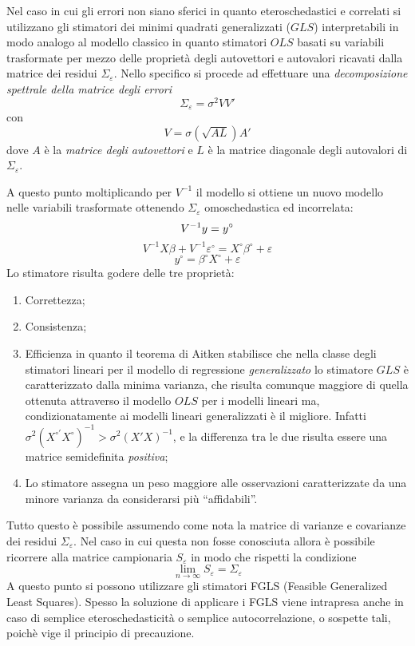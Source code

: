 \documentclass[a4page, 11pt]{article} %
\begin{document}
Nel caso in cui gli errori non siano sferici in quanto eteroschedastici e correlati si utilizzano gli stimatori dei minimi quadrati generalizzati ($GLS$) interpretabili in modo analogo al modello classico in quanto stimatori $OLS$ basati su variabili trasformate per mezzo delle proprietà degli autovettori e autovalori ricavati dalla matrice dei residui $\Sigma_\varepsilon$.
Nello specifico si procede ad effettuare una \textit{decomposizione spettrale della matrice degli errori} 
\[
\Sigma_\varepsilon = \sigma^2 VV'
\]
con
\[
V = \sigma (\sqrt{AL})A'
\]
dove $A$ è la \textit{matrice degli autovettori} e $L$ è la matrice diagonale degli autovalori di $\Sigma_\varepsilon$.

A questo punto moltiplicando per $V^{-1}$ il modello si ottiene un nuovo modello nelle variabili trasformate ottenendo $\Sigma_\varepsilon$ omoschedastica ed incorrelata:
\begin{equation*}
V^{-1}y = y^\circ \\
\end{equation*}
\begin{equation*}
V^{-1}X\beta + V^{-1}\varepsilon^\circ = X^\circ\beta^\circ + \varepsilon
\end{equation*}
\begin{equation*}
y^\circ = \beta^\circ X^\circ + \varepsilon
\end{equation*}
Lo stimatore risulta godere delle tre proprietà:
\begin{enumerate}[noitemsep]
\item Correttezza;
\item Consistenza;
\item Efficienza in quanto il teorema di Aitken stabilisce che nella classe degli stimatori lineari per il modello di regressione \textit{generalizzato} lo stimatore $GLS$ è caratterizzato dalla minima varianza, che risulta comunque maggiore di quella ottenuta attraverso il modello $OLS$ per i modelli lineari ma, condizionatamente ai modelli lineari generalizzati è il migliore. Infatti $\sigma^2 (X^{\circ '}X^{\circ})^{-1} >\sigma^2 (X'X)^{-1}$, e la differenza tra le due risulta essere una matrice semidefinita \textit{positiva};
\item Lo stimatore assegna un peso maggiore alle osservazioni caratterizzate da una minore varianza da considerarsi più ``affidabili''.
\end{enumerate}
Tutto questo è possibile assumendo come nota la matrice di varianze e covarianze dei residui $\Sigma_\varepsilon$. Nel caso in cui questa non fosse conosciuta allora è possibile ricorrere alla matrice campionaria $S_\varepsilon$ in modo che rispetti la condizione 
\[
\lim_{n\to \infty}{S_\varepsilon = \Sigma_\varepsilon}
\]
 A questo punto si possono utilizzare gli stimatori FGLS (Feasible Generalized Least Squares). Spesso la soluzione di applicare i FGLS viene intrapresa anche in caso di semplice eteroschedasticità o semplice autocorrelazione, o sospette tali, poichè vige il principio di precauzione.
\end{document}

